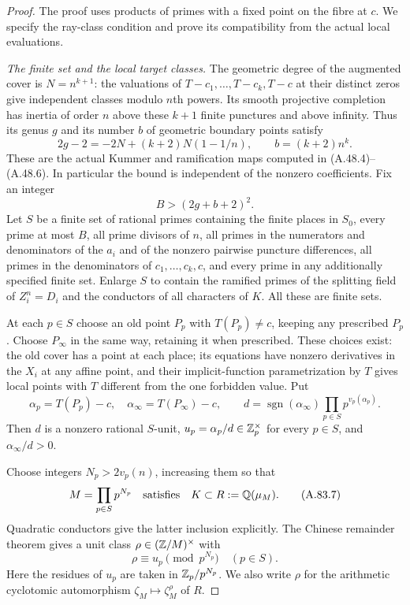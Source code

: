 \begin{proof}
The proof uses products of primes with a fixed point on the fibre
at $c$.  We specify the ray-class condition and prove its
compatibility from the actual local evaluations.

\emph{The finite set and the local target classes.}
The geometric degree of the augmented cover is $N=n^{k+1}$:
the valuations of $T-c_1,\ldots,T-c_k,T-c$ at their distinct
zeros give independent classes modulo $n$th powers.
Its smooth projective completion has inertia of order $n$
above these $k+1$ finite punctures and above infinity.
Thus its genus $g$ and its number $b$ of geometric boundary
points satisfy
\[
 2g-2=-2N+(k+2)N(1-1/n),\qquad b=(k+2)n^k.
 \tag{A.83.4}
\]
These are the actual Kummer and ramification maps computed in
(A.48.4)--(A.48.6).  In particular the bound is independent
of the nonzero coefficients.  Fix an integer
\[
                         B>(2g+b+2)^2.
 \tag{A.83.5}
\]
Let $S$ be a finite set of rational primes containing the finite
places in $S_0$, every prime at most $B$, all prime divisors of
$n$, all primes in the numerators and denominators of the $a_i$
and of the nonzero pairwise puncture differences, all primes
in the denominators of $c_1,\ldots,c_k,c$, and every prime in
any additionally specified finite set.
Enlarge $S$ to contain the ramified primes of the splitting field
of $Z_i^n=D_i$ and the conductors of all characters of $K$.
All these are finite sets.

At each $p\in S$ choose an old point $P_p$ with $T(P_p)\ne c$,
keeping any prescribed $P_p$.  Choose $P_\infty$ in the same
way, retaining it when prescribed.  These choices exist:
the old cover has a point at each place; its equations have
nonzero derivatives in the $X_i$ at any affine point, and
their implicit-function parametrization by $T$ gives local
points with $T$ different from the one forbidden value.
Put
\[
 \alpha_p=T(P_p)-c,\quad \alpha_\infty=T(P_\infty)-c,
 \qquad
 d=\operatorname{sgn}(\alpha_\infty)
                          \prod_{p\in S}p^{v_p(\alpha_p)}.
 \tag{A.83.6}
\]
Then $d$ is a nonzero rational $S$-unit,
$u_p=\alpha_p/d\in\mathbb Z_p^\times$ for every $p\in S$,
and $\alpha_\infty/d>0$.

Choose integers $N_p>2v_p(n)$, increasing them so that
\[
 M=\prod_{p\in S}p^{N_p}
       \quad\text{satisfies}\quad K\subset R:=\mathbb Q(\mu_M).
 \tag{A.83.7}
\]
Quadratic conductors give the latter inclusion explicitly.
The Chinese remainder theorem gives a unit class
$\rho\in(\mathbb Z/M)^\times$ with
\[
                    \rho\equiv u_p\pmod {p^{N_p}}\quad(p\in S).
 \tag{A.83.8}
\]
Here the residues of $u_p$ are taken in $\mathbb Z_p/p^{N_p}$.
We also write $\rho$ for the arithmetic cyclotomic automorphism
$\zeta_M\mapsto\zeta_M^\rho$ of $R$.


\end{proof}

